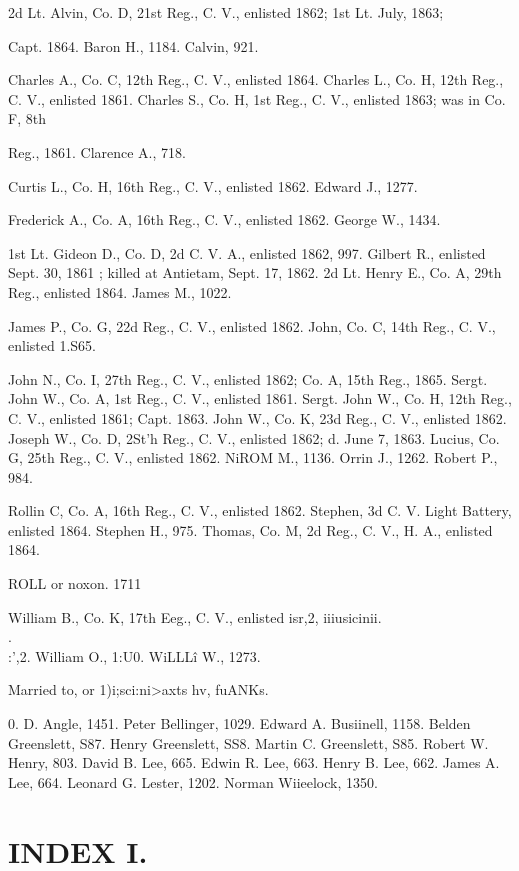 2d Lt. Alvin, Co. D, 21st Reg., C. V., enlisted 1862; 1st Lt. July, 1863; 

Capt. 1864. 
Baron H., 1184. 
Calvin, 921. 

Charles A., Co. C, 12th Reg., C. V., enlisted 1864. 
Charles L., Co. H, 12th Reg., C. V., enlisted 1861. 
Charles S., Co. H, 1st Reg., C. V., enlisted 1863; was in Co. F, 8th 

Reg., 1861. 
Clarence A., 718. 

Curtis L., Co. H, 16th Reg., C. V., enlisted 1862. 
Edward J., 1277. 

Frederick A., Co. A, 16th Reg., C. V., enlisted 1862. 
George W., 1434. 

1st Lt. Gideon D., Co. D, 2d C. V. A., enlisted 1862, 997. 
Gilbert R., enlisted Sept. 30, 1861 ; killed at Antietam, Sept. 17, 1862. 
2d Lt. Henry E., Co. A, 29th Reg., enlisted 1864. 
James M., 1022. 

James P., Co. G, 22d Reg., C. V., enlisted 1862. 
John, Co. C, 14th Reg., C. V., enlisted 1.S65. 

John N., Co. I, 27th Reg., C. V., enlisted 1862; Co. A, 15th Reg., 1865. 
Sergt. John W., Co. A, 1st Reg., C. V., enlisted 1861. 
Sergt. John W., Co. H, 12th Reg., C. V., enlisted 1861; Capt. 1863. 
John W., Co. K, 23d Reg., C. V., enlisted 1862. 
Joseph W., Co. D, 2St'h Reg., C. V., enlisted 1862; d. June 7, 1863. 
Lucius, Co. G, 25th Reg., C. V., enlisted 1862. 
NiROM M., 1136. 
Orrin J., 1262. 
Robert P., 984. 

Rollin C, Co. A, 16th Reg., C. V., enlisted 1862. 
Stephen, 3d C. V. Light Battery, enlisted 1864. 
Stephen H., 975. 
Thomas, Co. M, 2d Reg., C. V., H. A., enlisted 1864. 



ROLL or noxon. 1711 

William B., Co. K, 17th Eeg., C. V., enlisted isr,2, iiiusicinii. \\.\\:',2. 
William O., 1:U0. 
WiLLL\^i W., 1273. 

Married to, or 1)i;sci:ni>axts hv, fuANKs. 

0. D. Angle, 1451. 
Peter Bellinger, 1029. 
Edward A. Busiinell, 1158. 
Belden Greenslett, S87. 
Henry Greenslett, SS8. 
Martin C. Greenslett, S85. 
Robert W. Henry, 803. 
David B. Lee, 665. 
Edwin R. Lee, 663. 
Henry B. Lee, 662. 
James A. Lee, 664. 
Leonard G. Lester, 1202. 
Norman Wiieelock, 1350. 



\chapter{INDEX I.}
